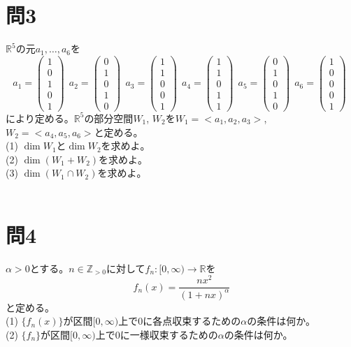 ﻿\documentclass{jsarticle}
\begin{document}
\section*{問3}
$\mathbb{R}^5$の元$a_1, \ldots , a_6$を
$$
a_{1} = \begin{pmatrix} 1 \\ 0 \\ 1 \\ 0 \\ 1 \end{pmatrix} \ \
a_{2} = \begin{pmatrix} 0 \\ 1 \\ 0 \\ 1 \\ 0 \end{pmatrix} \ \
a_{3} = \begin{pmatrix} 1 \\ 1 \\ 0 \\ 0 \\ 1 \end{pmatrix} \ \
a_{4} = \begin{pmatrix} 1 \\ 1 \\ 0 \\ 1 \\ 1 \end{pmatrix} \ \
a_{5} = \begin{pmatrix} 0 \\ 1 \\ 0 \\ 1 \\ 0 \end{pmatrix} \ \
a_{6} = \begin{pmatrix} 1 \\ 0 \\ 0 \\ 0 \\ 1 \end{pmatrix} \ \
$$
により定める。$\mathbb{R}^5$の部分空間$W_1$, $W_2$を$W_1 = < a_1, a_2, a_3 >$, $W_2 = < a_4, a_5, a_6 >$と定める。\\
(1) $\dim W_1$と$\dim W_2$を求めよ。\\
(2) $\dim(W_1+W_2)$を求めよ。\\
(3) $\dim(W_1 \cap W_2)$を求めよ。\\ \\

\section*{問4}
\noindent
$\alpha > 0$とする。$n \in \mathbb{Z}_{>0}$に対して$f_n : [ 0, \infty) \rightarrow \mathbb{R}$を
$$
f_n(x) = \frac{nx^2}{(1 + nx)^{\alpha}}
$$
と定める。\\
(1) $\{ f_n(x)\}$が区間$[0, \infty)$上で0に各点収束するための$\alpha$の条件は何か。\\
(2) $\{ f_n\}$が区間$[0, \infty)$上で0に一様収束するための$\alpha$の条件は何か。\\ \\
\end{document}
